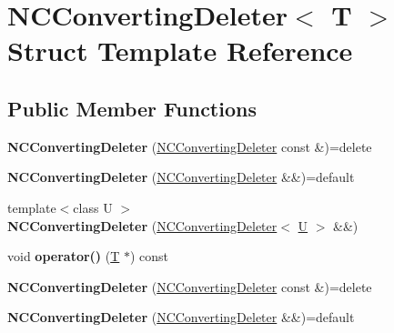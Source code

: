 \hypertarget{struct_n_c_converting_deleter}{}\section{N\+C\+Converting\+Deleter$<$ T $>$ Struct Template Reference}
\label{struct_n_c_converting_deleter}
\subsection*{Public Member Functions}
\begin{DoxyCompactItemize}
\item 
\mbox{\label{struct_n_c_converting_deleter_ae9e766fbeb2055f20c6763e128b8c965}} 
{\bfseries N\+C\+Converting\+Deleter} (\mbox{\hyperlink{struct_n_c_converting_deleter}{N\+C\+Converting\+Deleter}} const \&)=delete
\item 
\mbox{\label{struct_n_c_converting_deleter_a0edd25a4114507cb417605a7842cb8ae}} 
{\bfseries N\+C\+Converting\+Deleter} (\mbox{\hyperlink{struct_n_c_converting_deleter}{N\+C\+Converting\+Deleter}} \&\&)=default
\item 
\mbox{\label{struct_n_c_converting_deleter_aa87a11e9932a5db8059195ac6c9a9ca2}} 
{\footnotesize template$<$class U $>$ }\\{\bfseries N\+C\+Converting\+Deleter} (\mbox{\hyperlink{struct_n_c_converting_deleter}{N\+C\+Converting\+Deleter}}$<$ \mbox{\hyperlink{union_u}{U}} $>$ \&\&)
\item 
\mbox{\label{struct_n_c_converting_deleter_a27fe48ce0af61aaafed88a87ca004273}} 
void {\bfseries operator()} (\mbox{\hyperlink{struct_t}{T}} $\ast$) const
\item 
\mbox{\label{struct_n_c_converting_deleter_ae9e766fbeb2055f20c6763e128b8c965}} 
{\bfseries N\+C\+Converting\+Deleter} (\mbox{\hyperlink{struct_n_c_converting_deleter}{N\+C\+Converting\+Deleter}} const \&)=delete
\item 
\mbox{\label{struct_n_c_converting_deleter_a0edd25a4114507cb417605a7842cb8ae}} 
{\bfseries N\+C\+Converting\+Deleter} (\mbox{\hyperlink{struct_n_c_converting_deleter}{N\+C\+Converting\+Deleter}} \&\&)=default

\end{DoxyCompactItemize}
